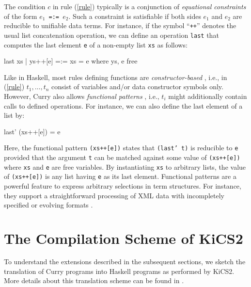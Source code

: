 \documentclass{llncs}
\newcommand{\code}[1]{\mbox{\small\texttt{#1}}}
\begin{document}
The condition $c$ in rule (\ref{rule}) typically is a
conjunction of \emph{equational constraints}
of the form \code{$e_1$\,=:=\,$e_2$}.
Such a constraint is satisfiable if
both sides $e_1$ and $e_2$ are reducible to unifiable data terms.
For instance, if the symbol ``\code{++}'' denotes the usual list
concatenation operation, we can define an operation \code{last}
that computes the last element \code{e} of a non-empty list \code{xs}
as follows:
%
\label{ex:last}
\begin{curry}
  last xs | ys++[e] =:= xs  = e   where ys, e free
\end{curry}
%
Like in Haskell, most rules defining functions are \emph{constructor-based} 
\cite{ODonnell85}, i.e., in (\ref{rule})
$t_1,\ldots,t_n$ consist of variables and/or data constructor symbols
only.  However, Curry also allows \emph{functional patterns}
\cite{AntoyHanus05LOPSTR}, i.e., $t_i$ might additionally contain calls to
defined operations. For instance, we can also define the last element
of a list by:
%
\begin{curry}
  last' (xs++[e]) = e
\end{curry}
%
Here, the functional pattern \code{(xs++[e])}
states that \code{(last' t)} is reducible
to \code{e} provided that the argument \code{t} can be matched against
some value of \code{(xs++[e])} where \code{xs} and \code{e} are
free variables.
By instantiating \code{xs} to arbitrary lists, the value
of \code{(xs++[e])} is any list having \code{e} as its last element.
Functional patterns are a powerful feature to express arbitrary 
selections in term structures.
For instance, they support a straightforward
processing of XML data with incompletely specified
or evolving formats \cite{Hanus11ICLP}.




\section{The Compilation Scheme of KiCS2}
\label{sec:Compilation}

To understand the extensions described in the subsequent sections,
we sketch the translation of Curry programs
into Haskell programs as performed by KiCS2.
More details about this translation scheme can be found in
\cite{BrasselFischer08IFL,BrasselHanusPeemoellerReck11}.
\end{document}
